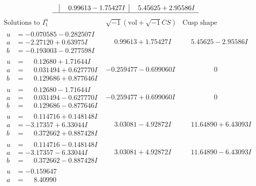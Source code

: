 \documentclass[1p]{elsarticle_modified}
\theoremstyle{definition}
\newcommand{\I}{\sqrt{-1}}
\begin{document}
$$\begin{array}{c|c|c}
 & \phantom{-}0.99613 - 1.75427 I & \phantom{-}5.45625 + 2.95586 I\\
 \hline 
 \end{array}$$\newpage$$\begin{array}{c|c|c}  
\text{Solutions to }I^u_{1}& \I (\text{vol} + \sqrt{-1}CS) & \text{Cusp shape}\\
 \hline 
\begin{aligned}
u &= -0.070585 - 0.282507 I \\
a &= -2.27120 + 0.63975 I \\
b &= -0.193003 - 0.277598 I\end{aligned}
 & \phantom{-}0.99613 + 1.75427 I & \phantom{-}5.45625 - 2.95586 I \\ \hline\begin{aligned}
u &= \phantom{-}0.12680 + 1.71644 I \\
a &= \phantom{-}0.031494 + 0.627770 I \\
b &= \phantom{-}0.129686 + 0.877646 I\end{aligned}
 & -0.259477 - 0.699060 I & \phantom{-0.000000 } 0 \\ \hline\begin{aligned}
u &= \phantom{-}0.12680 - 1.71644 I \\
a &= \phantom{-}0.031494 - 0.627770 I \\
b &= \phantom{-}0.129686 - 0.877646 I\end{aligned}
 & -0.259477 + 0.699060 I & \phantom{-0.000000 } 0 \\ \hline\begin{aligned}
u &= \phantom{-}0.114716 + 0.148148 I \\
a &= -3.17357 + 6.33044 I \\
b &= \phantom{-}0.372662 + 0.887428 I\end{aligned}
 & \phantom{-}3.03081 - 4.92872 I & \phantom{-}11.64890 + 6.43093 I \\ \hline\begin{aligned}
u &= \phantom{-}0.114716 - 0.148148 I \\
a &= -3.17357 - 6.33044 I \\
b &= \phantom{-}0.372662 - 0.887428 I\end{aligned}
 & \phantom{-}3.03081 + 4.92872 I & \phantom{-}11.64890 - 6.43093 I \\ \hline\begin{aligned}
u &= -0.159647\phantom{ +0.000000I} \\
a &= \phantom{-}8.40990\phantom{ +0.000000I} \\

\end{aligned}
\end{array}$$
\end{document}
